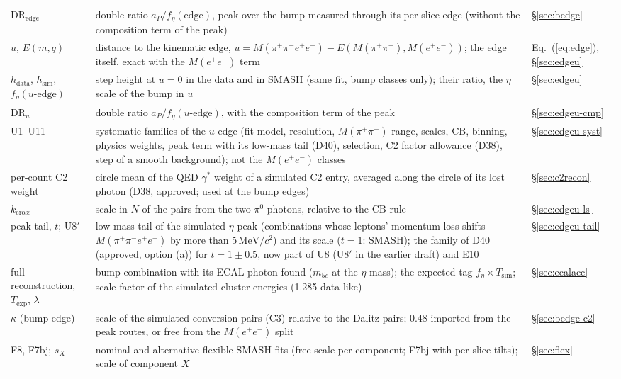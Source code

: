 \documentclass[11pt,a4paper]{article}
\newcommand{\piz}{\ensuremath{\pi^{0}}\xspace}
\newcommand{\Mfour}{\ensuremath{M(\pi^{+}\pi^{-}e^{+}e^{-})}\xspace}
\newcommand{\Mee}{\ensuremath{M(e^{+}e^{-})}\xspace}
\newcommand{\Mpipi}{\ensuremath{M(\pi^{+}\pi^{-})}\xspace}
\newcommand{\MeVcc}{\ensuremath{\mathrm{MeV}/c^{2}}\xspace}
\newcommand{\aP}{\ensuremath{a_P}\xspace}
\begin{document}
{\begin{longtable}{@{}>{\raggedright\arraybackslash}p{3.0cm} >{\raggedright\arraybackslash}p{\dimexpr\textwidth-3.0cm-2.0cm-4\tabcolsep\relax} >{\raggedright\arraybackslash}p{2.0cm}@{}}
DR$_{\mathrm{edge}}$ & double ratio $\aP/f_\eta(\mathrm{edge})$, peak over the bump measured through its per-slice edge (without the composition term of the peak) & \S\ref{sec:bedge} \\
$u$, $E(m,q)$ & distance to the kinematic edge, $u=\Mfour-E(\Mpipi,\Mee)$; the edge itself, exact with the \Mee term & Eq.~(\ref{eq:edge}), \S\ref{sec:edgeu} \\
$h_{\mathrm{data}}$, $h_{\mathrm{sim}}$, $f_\eta(u\text{-edge})$ & step height at $u=0$ in the data and in SMASH (same fit, bump classes only); their ratio, the $\eta$ scale of the bump in $u$ & \S\ref{sec:edgeu} \\
DR$_u$ & double ratio $\aP/f_\eta(u\text{-edge})$, with the composition term of the peak & \S\ref{sec:edgeu-cmp} \\
U1--U11 & systematic families of the $u$-edge (fit model, resolution, \Mpipi range, scales, CB, binning, physics weights, peak term with its low-mass tail (D40), selection, C2 factor allowance (D38), step of a smooth background); not the \Mee classes & \S\ref{sec:edgeu-syst} \\
per-count C2 weight & circle mean of the QED $\gamma^*$ weight of a simulated C2 entry, averaged along the circle of its lost photon (D38, approved; used at the bump edges) & \S\ref{sec:c2recon} \\
$k_{\mathrm{cross}}$ & scale in $N$ of the pairs from the two \piz photons, relative to the CB rule & \S\ref{sec:edgeu-ls} \\
peak tail, $t$; U8$'$ & low-mass tail of the simulated $\eta$ peak (combinations whose leptons' momentum loss shifts \Mfour by more than 5\,\MeVcc) and its scale ($t=1$: SMASH); the family of D40 (approved, option (a)) for $t=1\pm0.5$, now part of U8 (U8$'$ in the earlier draft) and E10 & \S\ref{sec:edgeu-tail} \\
full reconstruction, $T_{\mathrm{exp}}$, $\lambda$ & bump combination with its ECAL photon found ($m_{5c}$ at the $\eta$ mass); the expected tag $f_\eta\times T_{\mathrm{sim}}$; scale factor of the simulated cluster energies (1.285 data-like) & \S\ref{sec:ecalacc} \\
$\kappa$ (bump edge) & scale of the simulated conversion pairs (C3) relative to the Dalitz pairs; 0.48 imported from the peak routes, or free from the \Mee split & \S\ref{sec:bedge-c2} \\
F8, F7bj; $s_X$ & nominal and alternative flexible SMASH fits (free scale per component; F7bj with per-slice tilts); scale of component $X$ & \S\ref{sec:flex} \\

\end{longtable}}
\end{document}
